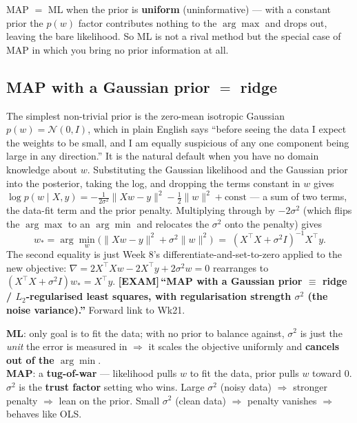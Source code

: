 \documentclass[11pt, a4paper]{article}
\newcommand{\examflag}{\textcolor{tipBd}{\textbf{[EXAM]}}\,}
\newcommand{\kw}[1]{\textbf{#1}}
\begin{document}
MAP $=$ ML when the prior is \kw{uniform} (uninformative) — with a constant prior the $p(w)$ factor
contributes nothing to the $\arg\max$ and drops out, leaving the bare likelihood. So ML is not a
rival method but the special case of MAP in which you bring no prior information at all.

\subsection{MAP with a Gaussian prior $=$ ridge}

The simplest non-trivial prior is the zero-mean isotropic Gaussian $p(w)=\mathcal N(0,I)$, which in
plain English says ``before seeing the data I expect the weights to be small, and I am equally
suspicious of any one component being large in any direction.'' It is the natural default when you
have no domain knowledge about $w$. Substituting the Gaussian likelihood and the Gaussian prior into
the posterior, taking the log, and dropping the terms constant in $w$ gives
$\log p(w\mid X,y)=-\tfrac{1}{2\sigma^2}\|Xw-y\|^2-\tfrac12\|w\|^2+\text{const}$ — a sum of two
terms, the data-fit term and the prior penalty. Multiplying through by $-2\sigma^2$ (which flips the
$\arg\max$ to an $\arg\min$ and relocates the $\sigma^2$ onto the penalty) gives
\[
w_\ast=\arg\min_w\big(\|Xw-y\|^2+\sigma^2\|w\|^2\big)\;=\;(X^\top X+\sigma^2 I)^{-1}X^\top y.
\]
The second equality is just Week 8's differentiate-and-set-to-zero applied to the new objective:
$\nabla=2X^\top Xw-2X^\top y+2\sigma^2 w=0$ rearranges to $(X^\top X+\sigma^2 I)w_\ast=X^\top y$.
\examflag{}\kw{``MAP with a Gaussian prior $\equiv$ ridge / $L_2$-regularised least squares, with
regularisation strength $\sigma^2$ (the noise variance).''} Forward link to Wk21.

\begin{notebox}
\kw{ML}: only goal is to fit the data; with no prior to balance against, $\sigma^2$ is just the
\emph{unit} the error is measured in $\Rightarrow$ it scales the objective uniformly and
\kw{cancels out of the $\arg\min$}. \\
\kw{MAP}: a \kw{tug-of-war} — likelihood pulls $w$ to fit the data, prior pulls $w$ toward $0$.
$\sigma^2$ is the \kw{trust factor} setting who wins. Large $\sigma^2$ (noisy data) $\Rightarrow$
stronger penalty $\Rightarrow$ lean on the prior. Small $\sigma^2$ (clean data) $\Rightarrow$ penalty
vanishes $\Rightarrow$ behaves like OLS.
\end{notebox}
\end{document}

